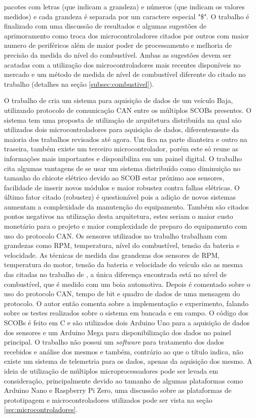 pacotes com letras (que indicam a grandeza) e números (que indicam os valores medidos) e cada grandeza é separada por um caractere especial "\$". O trabalho é finalizado com uma discussão de resultados e algumas sugestões de aprimoramento como troca dos microcontroladores citados por outros com maior numero de periféricos além de maior poder de processamento e melhoria de precisão da medida do nível do combustível. Ambas as sugestões devem ser acatadas com a utilização dos microcontroladores mais recentes disponíveis no mercado e um método de medida de nível de combustível diferente do citado no trabalho (detalhes na seção \ref{subsec:combustivel}).

O trabalho de  cria um sistema para aquisição de dados de um veículo Baja, utilizando protocolo de comunicação CAN entre os múltiplos SCOBs presentes. O sistema tem uma proposta de utilização de arquitetura distribuída na qual são utilizados dois microcontroladores para aquisição de dados, diferentemente da maioria dos trabalhos revisados até agora. Um fica na parte dianteira e outro na traseira, também existe um terceiro microcontrolador, porém este só reune as informações mais importantes e disponibiliza em um painel digital. O trabalho cita algumas vantagens de se usar um sistema distribuído como diminuição no tamanho do chicote elétrico devido ao SCOB estar próximo aos sensores, facilidade de inserir novos módulos e maior robustez contra falhas elétricas. O último fator citado (robustez) é questionável pois a adição de novos sistemas aumentam a complexidade da manutenção do equipamento. Também são citados pontos negativos na utilização desta arquitetura, estes seriam o maior custo monetário para o projeto e maior complexidade de preparo do equipamento com uso do protocolo CAN. Os sensores utilizados no trabalho trabalham com grandezas como RPM, temperatura, nível do combustível, tensão da bateria e velocidade. As técnicas de medida das grandezas dos sensores de RPM, temperatura do motor, tensão da bateria e velocidade do veículo são as mesma das citadas no trabalho de , a única diferença encontrada está no nível de combustível, que é medido com um boia automotiva. Depois é comentado sobre o uso do protocolo CAN, tempo de bit e quadro de dados de uma mensagem do protocolo. O autor então comenta sobre a implementação e experimento, falando sobre os testes realizados sobre o sistema em bancada e em campo. O código dos SCOBs é feito em C e são utilizados dois Arduino Uno para a aquisição de dados dos sensores e um Arduino Mega para disponibilização dos dados no painel principal. O trabalho não possui um \textit{software} para tratamento dos dados recebidos e análise dos mesmos e também, contrário ao que o título indica, não existe um sistema de telemetria para os dados, apenas da aquisição dos mesmo. A ideia de utilização de múltiplos microprocessadores pode ser levada em consideração, principalmente devido ao tamanho de algumas plataformas como Arduino Nano e Raspberry Pi Zero, uma discussão sobre as plataformas de prototipagem e microcontroladores utilizados pode ser vista na seção \ref{sec:microcontroladores}.

